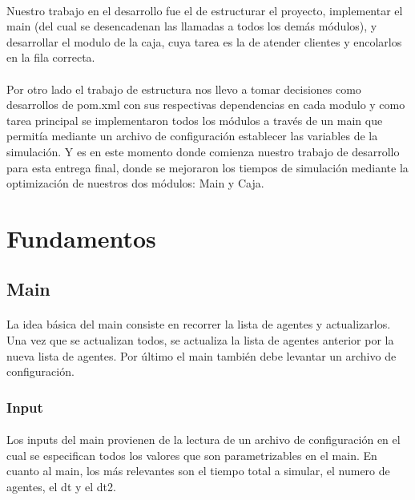 \documentclass{article}
\begin{document}
\paragraph{}
Nuestro trabajo en el desarrollo fue el de estructurar el proyecto, implementar el main (del cual se desencadenan las llamadas a todos los demás módulos),  y desarrollar el modulo de la caja, cuya tarea es la  de atender clientes y encolarlos en la fila correcta.

\paragraph{}
Por otro lado el trabajo de estructura nos llevo a tomar decisiones como desarrollos de pom.xml con sus respectivas dependencias en cada modulo y como tarea principal se implementaron todos los módulos a través de un main que permitía mediante un archivo de configuración establecer las variables de la simulación. Y es en este momento donde comienza nuestro trabajo de desarrollo para esta entrega final, donde se mejoraron los tiempos de simulación mediante la optimización de nuestros dos módulos: Main y Caja.

\section{Fundamentos}

\subsection{Main}

\paragraph{}
La idea básica del main consiste en recorrer la lista de agentes y actualizarlos. Una vez que se actualizan todos, se actualiza la lista de agentes anterior por la nueva lista de agentes. Por último el main también debe levantar un archivo de configuración.

\subsubsection{Input}

\paragraph{}

Los inputs del main provienen de la lectura de un archivo de configuración en el cual se especifican todos los valores que son parametrizables en el main. En cuanto al main, los más relevantes son el tiempo total a simular, el numero de agentes, el dt  y el dt2.
\end{document}
